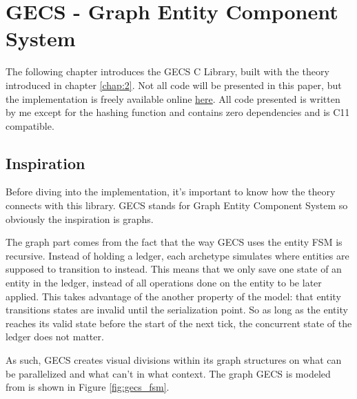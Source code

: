 \section{GECS - Graph Entity Component System}
\label{chap:3}

The following chapter introduces the GECS C Library, built with the theory introduced in chapter \ref{chap:2}. Not all code will be presented in this paper, but the implementation is freely available online \href{https://github.com/EmilChoparinov/GECS}{here}. All code presented is written by me except for the hashing function and contains zero dependencies and is C11 compatible.

\subsection{Inspiration}
Before diving into the implementation, it's important to know how the theory connects with this library. GECS stands for Graph Entity Component System so obviously the inspiration is graphs. 

The graph part comes from the fact that the way GECS uses the entity FSM is recursive. Instead of holding a ledger, each archetype simulates where entities are supposed to transition to instead. This means that we only save one state of an entity in the ledger, instead of all operations done on the entity to be later applied. This takes advantage of the another property of the model: that entity transitions states are invalid until the serialization point. So as long as the entity reaches its valid state before the start of the next tick, the concurrent state of the ledger does not matter. 

As such, GECS creates visual divisions within its graph structures on what can be parallelized and what can't in what context. The graph GECS is modeled from is shown in Figure \ref{fig:gecs_fsm}.

